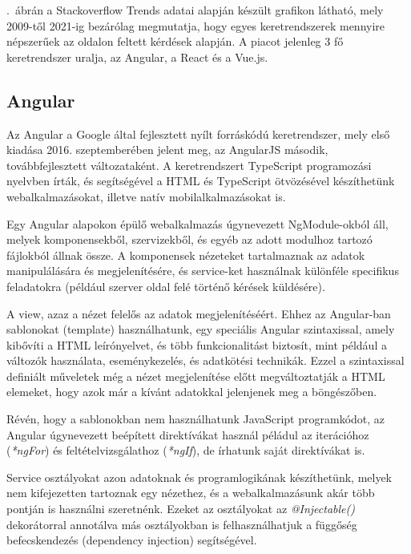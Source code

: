 \documentclass[
]{thesis-ekf}
\theoremstyle{definition}
\theoremstyle{remark}
\begin{document}
	\Az{\ref{fig:stackoverflow_trends}}.~ábrán a Stackoverflow Trends adatai alapján készült grafikon látható, mely 2009-től 2021-ig bezárólag megmutatja, hogy egyes keretrendszerek mennyire népszerűek az oldalon feltett kérdések alapján. A piacot jelenleg 3 fő keretrendszer uralja, az Angular, a React és a Vue.js.
	
	\subsection[Angular]{Angular\cite{angulardocs}}
	Az Angular a Google által fejlesztett nyílt forráskódú keretrendszer, mely első kiadása 2016. szeptemberében jelent meg, az AngularJS második, továbbfejlesztett változataként. A keretrendszert TypeScript programozási nyelvben írták, és segítségével a HTML és TypeScript ötvözésével készíthetünk webalkalmazásokat, illetve natív mobilalkalmazásokat is.
	
	Egy Angular alapokon épülő webalkalmazás úgynevezett NgModule-okból áll, melyek komponensekből, szervizekből, és egyéb az adott modulhoz tartozó fájlokból állnak össze. A komponensek nézeteket tartalmaznak az adatok manipulálására és megjelenítésére, és service-ket használnak különféle specifikus feladatokra (például szerver oldal felé történő kérések küldésére).
	
	A view, azaz a nézet felelős az adatok megjelenítéséért. Ehhez az Angular-ban sablonokat (template) használhatunk, egy speciális Angular szintaxissal, amely kibővíti a HTML leírónyelvet, és több funkcionalitást biztosít, mint például a változók használata, eseménykezelés, és adatkötési technikák. Ezzel a szintaxissal definiált műveletek még a nézet megjelenítése előtt megváltoztatják a HTML elemeket, hogy azok már a kívánt adatokkal jelenjenek meg a böngészőben.
	
	Révén, hogy a sablonokban nem használhatunk JavaScript programkódot, az Angular úgynevezett beépített direktívákat használ péládul az iterációhoz (\emph{*ngFor}) és feltételvizsgálathoz (\emph{*ngIf}), de írhatunk saját direktívákat is.
	
	
	
	Service osztályokat azon adatoknak és programlogikának készíthetünk, melyek nem kifejezetten tartoznak egy nézethez, és a webalkalmazásunk akár több pontján is használni szeretnénk. Ezeket az osztályokat az \emph{@Injectable()} dekorátorral annotálva más osztályokban is felhasználhatjuk a függőség befecskendezés (dependency injection) segítségével.
	
\end{document}
